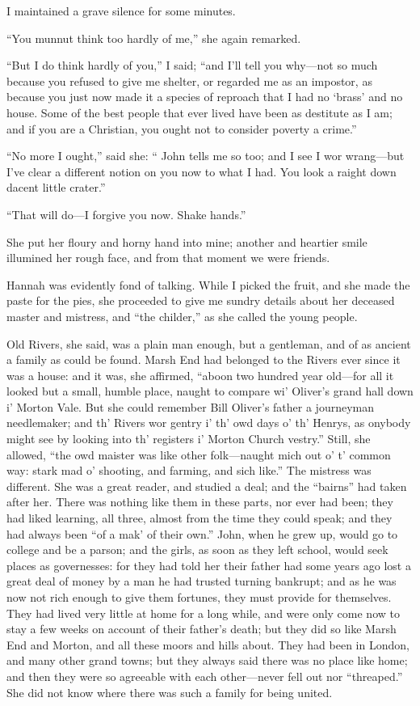 I maintained a grave silence for some minutes.

\enquote{You munnut think too hardly of me,} she again remarked.

\enquote{But I do think hardly of you,} I said; \enquote{and I'll tell
you why---not so much because you refused to give me shelter, or
regarded me as an impostor, as because you just now made it a species of
reproach that I had no \enquote{brass} and no house. Some of the best
people that ever lived have been as destitute as I am; and if you are a
Christian, you ought not to consider poverty a crime.}

\enquote{No more I ought,} said she: \enquote{\Mr{} \St{} John tells me so
too; and I see I wor wrang---but I've clear a different notion on you
now to what I had. You look a raight down dacent little crater.}

\enquote{That will do---I forgive you now. Shake hands.}

She put her floury and horny hand into mine; another and heartier smile
illumined her rough face, and from that moment we were friends.

Hannah was evidently fond of talking. While I picked the fruit, and she
made the paste for the pies, she proceeded to give me sundry details
about her deceased master and mistress, and \enquote{the childer,} as
she called the young people.

Old \Mr{} Rivers, she said, was a plain man enough, but a gentleman, and
of as ancient a family as could be found. Marsh End had belonged to the
Rivers ever since it was a house: and it was, she affirmed,
\enquote{aboon two hundred year old---for all it looked but a small,
humble place, naught to compare wi' \Mr{} Oliver's grand hall down i'
Morton Vale. But she could remember Bill Oliver's father a journeyman
needlemaker; and th' Rivers wor gentry i' th' owd days o' th' Henrys, as
onybody might see by looking into th' registers i' Morton Church
vestry.} Still, she allowed, \enquote{the owd maister was like other
folk---naught mich out o' t' common way: stark mad o' shooting, and
farming, and sich like.} The mistress was different. She was a great
reader, and studied a deal; and the \enquote{bairns} had taken after
her. There was nothing like them in these parts, nor ever had been;
they had liked learning, all three, almost from the time they could
speak; and they had always been \enquote{of a mak' of their own.} \Mr{}
\St{} John, when he grew up, would go to college and be a parson; and the
girls, as soon as they left school, would seek places as governesses:
for they had told her their father had some years ago lost a great deal
of money by a man he had trusted turning bankrupt; and as he was now not
rich enough to give them fortunes, they must provide for themselves. 
They had lived very little at home for a long while, and were only come
now to stay a few weeks on account of their father's death; but they did
so like Marsh End and Morton, and all these moors and hills about. They
had been in London, and many other grand towns; but they always said
there was no place like home; and then they were so agreeable with each
other---never fell out nor \enquote{threaped.} She did not know where
there was such a family for being united.

